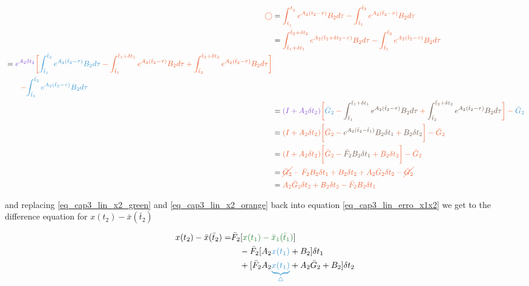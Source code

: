 \noindent
\begin{align}
	\orange{\bigcirc} 	&= \orange{\intlinAA{1}{2}{}{} - \intlinAbtt{1}{2}} \nonumber \\
					   	&= \orange{ \intlinCb{\bar{t}_1+\delta t_1}{\bar{t}_2+\delta t_2}{1}{2} - \intlinAbtt{1}{2}} \nonumber \\
						\begin{split}
							&= \orange{ \purple{ e^{A_2 \delta t_2} }
								\bigg[
									\blue{\intlinAbtt{1}{2}} - \intlinBb{\bar{t}_1}{\bar{t}_1 + \delta t_1}{1}{2} + \intlinBb{\bar{t}_2}{\bar{t}_2 + \delta t_2}{1}{2} \bigg] } \\
							& \qquad \orange{ - \blue{\intlinAbtt{1}{2}} }
						\end{split} \nonumber \\
						&= \orange{ \purple{(I + A_2 \delta t_2)}
							\bigg[
								\blue{\bar{G}_2} - \pink{\intlinBb{\bar{t}_1}{\bar{t}_1 + \delta t_1}{1}{2}} + \brown{\intlinBb{\bar{t}_2}{\bar{t}_2 + \delta t_2}{1}{2}}
							\bigg] - \blue{\bar{G}_2}
						} \nonumber \\
						&= \orange{ (I + A_2 \delta t_2)
							\bigg[
								\bar{G}_2 - \pink{e^{A_2(\bar{t}_2 - \bar{t}_1)} B_2 \delta t_1} + \brown{B_2 \delta t_2}
							\bigg] - \bar{G}_2
						} \nonumber \\
						&= \orange{ (I + A_2 \delta t_2)
							\bigg[
								\bar{G}_2 - \pink{\bar{F}_2 B_2 \delta t_1} + B_2 \delta t_2
							\bigg] - \bar{G}_2
						} \nonumber \\
						&= \orange{ \cancel{\bar{G}_2} - \bar{F}_2 B_2 \delta t_1 + B_2 \delta t_2 + A_2 \bar{G}_2 \delta t_2 - \cancel{\bar{G}_2} } \nonumber \\
						\label{eq_cap3_lin_x2_orange}
						&= \orange{ A_2 \bar{G}_2 \delta t_2 + B_2 \delta t_2 - \bar{F}_2 B_2 \delta t_1 }
\end{align}

\noindent 
and replacing \eqref{eq_cap3_lin_x2_green} and \eqref{eq_cap3_lin_x2_orange} back into equation \eqref{eq_cap3_lin_erro_x1x2} we get to the difference equation for 
$x(t_2) - \bar{x}(\bar{t}_2)$

\noindent
\begin{equation}
	\label{eq_xt2_xt1_0}
	\begin{split}
		x(t_2) - \bar{x}(\bar{t}_2) =  & \bar{F}_2 [\green{x(t_1) - \bar{x}_1(\bar{t}_1)}] \\
							     & \quad - \bar{F}_2 [A_2 \blue{x(t_1)} + B_2] \delta t_1 \\
							     & \quad + [ \bar{F}_2 A_2 \blue{\underbrace{x(t_1)}_{\triangle}} + A_2 \bar{G}_2 + B_2] \delta t_2
	\end{split} 
\end{equation}


